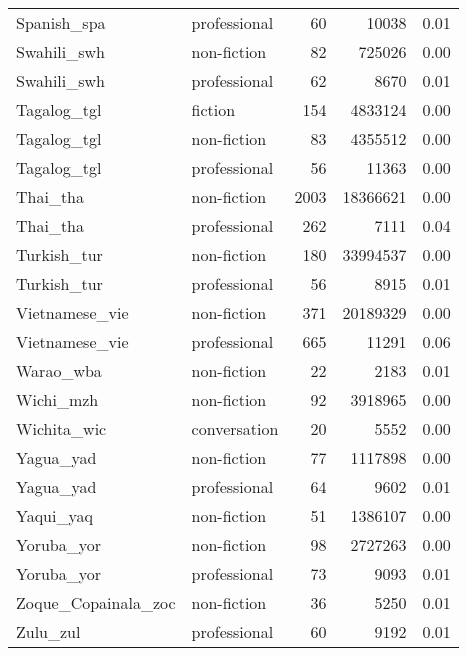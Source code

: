 \begin{longtable}{llrrr}
  Spanish\_spa & professional & 60 & 10038 & 0.01 \\ 
  Swahili\_swh & non-fiction & 82 & 725026 & 0.00 \\ 
  Swahili\_swh & professional & 62 & 8670 & 0.01 \\ 
  Tagalog\_tgl & fiction & 154 & 4833124 & 0.00 \\ 
  Tagalog\_tgl & non-fiction & 83 & 4355512 & 0.00 \\ 
  Tagalog\_tgl & professional & 56 & 11363 & 0.00 \\ 
  Thai\_tha & non-fiction & 2003 & 18366621 & 0.00 \\ 
  Thai\_tha & professional & 262 & 7111 & 0.04 \\ 
  Turkish\_tur & non-fiction & 180 & 33994537 & 0.00 \\ 
  Turkish\_tur & professional & 56 & 8915 & 0.01 \\ 
  Vietnamese\_vie & non-fiction & 371 & 20189329 & 0.00 \\ 
  Vietnamese\_vie & professional & 665 & 11291 & 0.06 \\ 
  Warao\_wba & non-fiction & 22 & 2183 & 0.01 \\ 
  Wichi\_mzh & non-fiction & 92 & 3918965 & 0.00 \\ 
  Wichita\_wic & conversation & 20 & 5552 & 0.00 \\ 
  Yagua\_yad & non-fiction & 77 & 1117898 & 0.00 \\ 
  Yagua\_yad & professional & 64 & 9602 & 0.01 \\ 
  Yaqui\_yaq & non-fiction & 51 & 1386107 & 0.00 \\ 
  Yoruba\_yor & non-fiction & 98 & 2727263 & 0.00 \\ 
  Yoruba\_yor & professional & 73 & 9093 & 0.01 \\ 
  Zoque\_Copainala\_zoc & non-fiction & 36 & 5250 & 0.01 \\ 
  Zulu\_zul & professional & 60 & 9192 & 0.01 \\ 
  \hline
\end{longtable}
